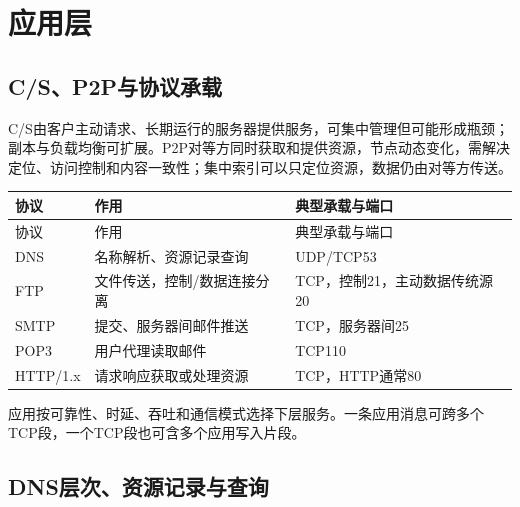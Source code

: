 \chapter{应用层}\label{CN06}

\section{C/S、P2P与协议承载}\label{CN06-model}

C/S由客户主动请求、长期运行的服务器提供服务，可集中管理但可能形成瓶颈；副本与负载均衡可扩展。P2P对等方同时获取和提供资源，节点动态变化，需解决定位、访问控制和内容一致性；集中索引可以只定位资源，数据仍由对等方传送。

\par\smallskip
{\fontsize{9.3}{12}\selectfont\setlength{\tabcolsep}{2.5pt}\setlength{\LTleft}{0pt}\setlength{\LTright}{0pt}
\begin{longtable}{@{}>{\raggedright\arraybackslash}p{}>{\raggedright\arraybackslash}p{}>{\raggedright\arraybackslash}p{}@{}}
\toprule
协议 & 作用 & 典型承载与端口 \\

\midrule\endfirsthead\toprule
协议 & 作用 & 典型承载与端口 \\

\midrule\endhead\bottomrule\endfoot
DNS & 名称解析、资源记录查询 & UDP/TCP53 \\

FTP & 文件传送，控制/数据连接分离 & TCP，控制21，主动数据传统源20 \\

SMTP & 提交、服务器间邮件推送 & TCP，服务器间25 \\

POP3 & 用户代理读取邮件 & TCP110 \\

HTTP/1.x & 请求响应获取或处理资源 & TCP，HTTP通常80 \\

\end{longtable}}
\par\smallskip

应用按可靠性、时延、吞吐和通信模式选择下层服务。一条应用消息可跨多个TCP段，一个TCP段也可含多个应用写入片段。

\section{DNS层次、资源记录与查询}\label{CN06-dns}

